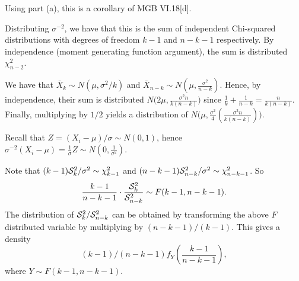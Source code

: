 \documentclass{stat_homework}
\begin{document}
\begin{solution}
  Using part (a), this is a corollary of MGB VI.18[d].
\end{solution}
\newpage



Distributing $\sigma^{-2}$, we have that this is the sum of independent Chi-squared distributions with degrees of freedom $k-1$ and $n-k-1$ respectively.  By independence (moment generating function argument), the sum is distributed $\chi^2_{n-2}$.


We have that $\bar X_k \sim N(\mu,\sigma^2/k)$ and $\bar X_{n-k} \sim N(\mu,\frac {\sigma^2}{n-k})$.  Hence, by independence, their sum is distributed $N\Big(2\mu, \frac{\sigma^2n}{k(n-k)}\Big)$ since $\frac 1k + \frac 1{n-k} = \frac n{k(n-k)}$.  Finally, multiplying by $1/2$ yields a distribution of $N\Big(\mu, \frac{\sigma^2}{4}(\frac{\sigma^2n}{k(n-k)})\Big)$.


Recall that $Z = (X_i - \mu)/\sigma \sim N(0,1)$, hence $\sigma^{-2}(X_i-\mu) = \frac 1\sigma Z \sim N(0,\frac 1{\sigma^2})$.


Note that $(k-1)\mathcal S_k^2/\sigma^2\sim\chi^2_{k-1}$ and $(n-k-1)\mathcal S_{n-k}^2/\sigma^2 \sim \chi^2_{n-k-1}$. So
$$
  \frac{k-1}{n-k-1} \cdot \frac {\mathcal S_k^2}{\mathcal S_{n-k}^2} \sim F(k-1,n-k-1).
$$
The distribution of $\mathcal S_k^2 / \mathcal S_{n-k}^2$ can be obtained by transforming the above $F$ distributed variable by multiplying by $(n-k-1)/(k-1)$.  This gives a density 
$$(k-1)/(n-k-1) f_{Y}\left( \frac{k-1}{n-k-1} \right),$$
where $Y \sim F(k-1,n-k-1)$.
\end{document}
